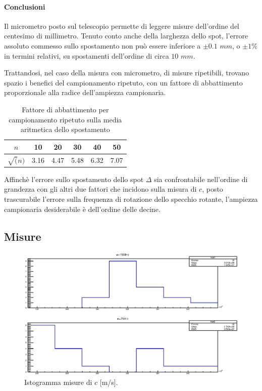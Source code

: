\paragraph{Conclusioni}

Il micrometro posto sul telescopio permette di leggere misure dell'ordine del centesimo di millimetro. Tenuto conto anche della larghezza dello spot, l'errore assoluto commesso sullo spostamento non può essere inferiore a $ \pm 0.1 $ $mm$, o $ \pm 1 \% $  in termini relativi, su spostamenti dell'ordine di circa $10$ $mm$.

Trattandosi, nel caso della misura con micrometro, di misure ripetibili, trovano spazio i benefici del campionamento ripetuto, con un fattore di abbattimento proporzionale alla radice dell'ampiezza campionaria.

\begin{table}[htbp]
\begin{center}
\begin{tabular}{|c|c|c|c|c|c|}
\hline
$n$ & 10 & 20 & 30 & 40 & 50 \\ \hline
$\sqrt(n)$ & 3.16 & 4.47 & 5.48 & 6.32 & 7.07 \\ \hline
\end{tabular}
\end{center}
\caption{Fattore di abbattimento per campionamento ripetuto sulla media aritmetica dello spostamento}
\label{=O1_P0_1}
\end{table}

Affinchè l'errore sullo spostamento dello spot $ \Delta $ sia confrontabile nell'ordine di grandezza con gli altri due fattori che incidono sulla misura di $ c $, posto trascurabile l'errore sulla frequenza di rotazione dello specchio rotante, l'ampiezza campionaria desiderabile è dell'ordine delle decine.



\subsection{ Misure }



%
%
    \begin{figure}[H]
    \centering
    \includegraphics[scale=0.8]{Grafici/O1_P2_c.eps}
    \caption{Istogramma misure di $c$ [m/s].}
    \label{fig:O1_P2_c}
    \end{figure} 
%